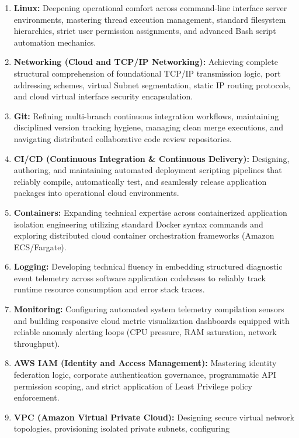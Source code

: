 \begin{enumerate}
\def\labelenumi{\arabic{enumi}.}
\tightlist
\item
  \textbf{Linux:} Deepening operational comfort across command-line
  interface server environments, mastering thread execution management,
  standard filesystem hierarchies, strict user permission assignments,
  and advanced Bash script automation mechanics.
\item
  \textbf{Networking (Cloud and TCP/IP Networking):} Achieving complete
  structural comprehension of foundational TCP/IP transmission logic,
  port addressing schemes, virtual Subnet segmentation, static IP
  routing protocols, and cloud virtual interface security encapsulation.
\item
  \textbf{Git:} Refining multi-branch continuous integration workflows,
  maintaining disciplined version tracking hygiene, managing clean merge
  executions, and navigating distributed collaborative code review
  repositories.
\item
  \textbf{CI/CD (Continuous Integration \& Continuous Delivery):}
  Designing, authoring, and maintaining automated deployment scripting
  pipelines that reliably compile, automatically test, and seamlessly
  release application packages into operational cloud environments.
\item
  \textbf{Containers:} Expanding technical expertise across
  containerized application isolation engineering utilizing standard
  Docker syntax commands and exploring distributed cloud container
  orchestration frameworks (Amazon ECS/Fargate).
\item
  \textbf{Logging:} Developing technical fluency in embedding structured
  diagnostic event telemetry across software application codebases to
  reliably track runtime resource consumption and error stack traces.
\item
  \textbf{Monitoring:} Configuring automated system telemetry
  compilation sensors and building responsive cloud metric visualization
  dashboards equipped with reliable anomaly alerting loops (CPU
  pressure, RAM saturation, network throughput).
\item
  \textbf{AWS IAM (Identity and Access Management):} Mastering identity
  federation logic, corporate authentication governance, programmatic
  API permission scoping, and strict application of Least Privilege
  policy enforcement.
\item
  \textbf{VPC (Amazon Virtual Private Cloud):} Designing secure virtual
  network topologies, provisioning isolated private subnets, configuring

\end{enumerate}
